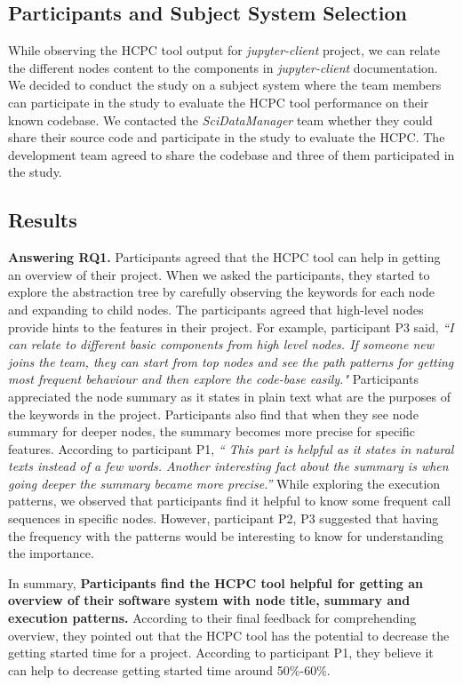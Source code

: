 \subsection{Participants and Subject System Selection}
While observing the HCPC tool output for \emph{jupyter-client} project, we can relate the different nodes content to the components in \emph{jupyter-client} documentation. We decided to conduct the study on a subject system where the team members can participate in the study to evaluate the HCPC tool performance on their known codebase. We contacted the \emph{SciDataManager} team whether they could share their source code and participate in the study to evaluate the HCPC. The development team agreed to share the codebase and three of them participated in the study. 
\subsection{Results}
\textbf{Answering RQ1.} Participants agreed that the HCPC tool can help in getting an overview of their project. When we asked the participants, they started to explore the abstraction tree by carefully observing the keywords for each node and expanding to child nodes. The participants agreed that high-level nodes provide hints to the features in their project. For example, participant P3 said, \emph{``I can relate to different basic components from high level nodes. If someone new joins the team, they can start from top nodes and see the path patterns for getting most frequent behaviour and then explore the code-base easily."} Participants appreciated the node summary as it states in plain text what are the purposes of the keywords in the project. Participants also find that when they see node summary for deeper nodes, the summary becomes more precise for specific features. 
According to participant P1, \emph{`` This part is helpful as it states in natural texts instead of a few words. Another interesting fact about the summary is when going deeper the summary became more precise.''} While exploring the execution patterns, we observed that participants find it helpful to know some frequent call sequences in specific nodes. However, participant P2, P3 suggested that having the frequency with the patterns would be interesting to know for understanding the importance. 

In summary, \textbf{Participants find the HCPC tool helpful for getting an overview of their software system with node title, summary and execution patterns.} According to their final feedback for comprehending overview, they pointed out that the HCPC tool has the potential to decrease the getting started time for a project. According to participant P1, they believe  it can help to decrease getting started time around 50\%-60\%.

